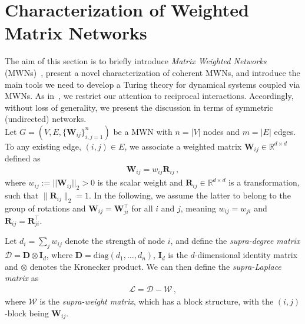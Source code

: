 \documentclass[aps,showpacs,preprintnumbers,amsmath,amssymb,twocolumn,superscriptaddress,floatfix,nofootinbib,10pt,pre]{revtex4-1}
\begin{document}

\section{Characterization of Weighted Matrix Networks}
\label{sec:char}

The aim of this section is to briefly introduce {\em Matrix Weighted Networks} (MWNs)~\cite{tian2025matrix}, present a novel characterization of coherent MWNs, and introduce the main tools we need to develop a Turing theory for dynamical systems coupled via MWNs. As in~\cite{tian2025matrix}, we restrict our attention to reciprocal interactions. Accordingly, without loss of generality, we present the discussion in terms of symmetric (undirected) networks.\\

Let $G=(V,E,\{\mathbf{W}_{ij}\}_{i,j=1}^n)$ be a MWN with $n=|V|$ nodes and $m=|E|$ edges. To any existing edge, $(i,j)\in E$, we associate a weighted matrix $\mathbf{W}_{ij}\in \mathbb{R}^{d\times d}$ defined as
\begin{align}
\label{eq:matrix}
    \mathbf{W}_{ij} = w_{ij}\mathbf{R}_{ij}\, ,
\end{align}
where $w_{ij}:=||\mathbf{W}_{ij}||_2>0$ is the scalar weight and $\mathbf{R}_{ij}\in\mathbb{R}^{d\times d}$ is a transformation, such that $\|\mathbf{R}_{ij}\|_2=1$. In the following, we assume the latter to belong to the group of rotations and  $\mathbf{W}_{ij}=\mathbf{W}_{ji}^\top$ for all $i$ and $j$, meaning $w_{ij}=w_{ji}$ and $\mathbf{R}_{ij}=\mathbf{R}_{ji}^\top$. 

Let $d_i=\sum_j w_{ij}$ denote the strength of node $i$, and define the \textit{supra-degree matrix} $\mathcal{D}=\mathbf{D}\otimes \mathbf{I}_d$, where $\mathbf{D}=\mathrm{diag}(d_1,\dots,d_n)$, $\mathbf{I}_d$ is the $d$-dimensional identity matrix and $\otimes$ denotes the Kronecker product. We can then define the {\em supra-Laplace matrix} as
\begin{align}
\label{eq:supraL}
\mathcal{L}=\mathcal{D}-\mathcal{W}\, ,
\end{align}
where $\mathcal{W}$ is the \textit{supra-weight matrix}, which has a block structure, with the $(i,j)$-block being $\mathbf{W}_{ij}$.\\
\end{document}
